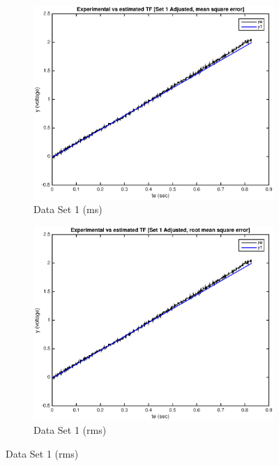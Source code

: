 \documentclass[11pt,a4paper]{article}
\begin{document}
\begin{enumerate}
   \begin{figure}[H]
	
  \begin{subfigure}{0.5\textwidth}
  \includegraphics[width=0.9\linewidth]{Matlab_Figures/y2_dataset1_ms.eps} 
  \caption{Data Set 1 (ms)}
  \label{fig:subim1}
  \end{subfigure}
  \begin{subfigure}{0.5\textwidth}
  \includegraphics[width=0.9\linewidth]{Matlab_Figures/y2_dataset1_rms.eps}
  \caption{Data Set 1 (rms)}
  \label{fig:subim2}
  \end{subfigure}
  

\end{figure}
\end{enumerate}
\end{document}
